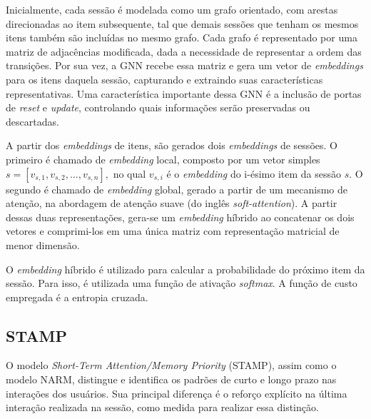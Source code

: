 Inicialmente, cada sessão é modelada como um grafo orientado, com arestas
direcionadas ao item subsequente, tal que demais sessões que tenham os mesmos
itens também são incluídas no mesmo grafo. Cada grafo é representado por uma
matriz de adjacências modificada, dada a necessidade de representar a ordem das
transições. Por sua vez, a GNN recebe essa matriz e gera um vetor de
\textit{embeddings} para os itens daquela sessão, capturando e extraindo suas
características representativas. Uma característica importante dessa GNN é a inclusão
de portas de \textit{reset} e \textit{update}, controlando quais informações
serão preservadas ou descartadas.

A partir dos \textit{embeddings} de itens, são gerados dois \textit{embeddings}
de sessões. O primeiro é chamado de \textit{embedding} local, composto por um
vetor simples $s = [v_{s,1}, v_{s,2}, \ldots, v_{s,n}],$ no qual $v_{s,i}$ é o
\textit{embedding} do i-ésimo item da sessão $s$. O segundo é chamado de
\textit{embedding} global, gerado a partir de um mecanismo de atenção, na
abordagem de atenção suave (do inglês \textit{soft-attention}). A partir dessas
duas representações, gera-se um \textit{embedding} híbrido ao concatenar os dois
vetores e comprimi-los em uma única matriz com representação matricial de menor
dimensão.

O \textit{embedding} híbrido é utilizado para calcular a probabilidade do próximo item
da sessão. Para isso, é utilizada uma função de ativação \textit{softmax}. A função de custo
empregada é a entropia cruzada.

\subsection{STAMP}
O modelo \textit{Short-Term Attention/Memory Priority} (STAMP), assim como o
modelo NARM, distingue e identifica os padrões de curto e longo prazo
nas interações dos usuários. Sua principal diferença é o reforço explícito na
última interação realizada na sessão, como medida para realizar essa distinção.

